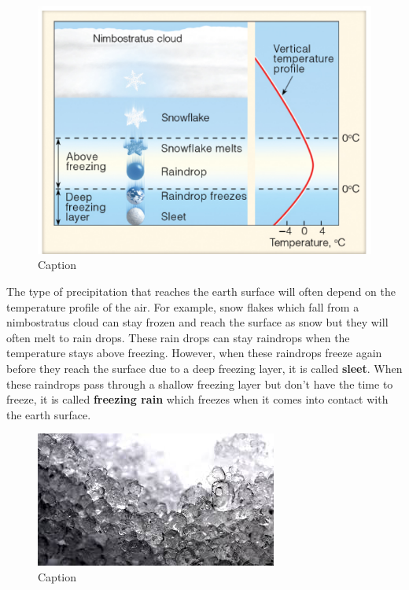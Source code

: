 \documentclass[12pt,oneside]{book}
\begin{document}
\begin{figure}

{\centering \includegraphics[width=0.9\linewidth]{figures/Figure338} 

}

\caption{Caption}\label{fig:Virga2}
\end{figure}

The type of precipitation that reaches the earth surface will often
depend on the temperature profile of the air. For example, snow flakes
which fall from a nimbostratus cloud can stay frozen and reach the
surface as snow but they will often melt to rain drops. These rain drops
can stay raindrops when the temperature stays above freezing. However,
when these raindrops freeze again before they reach the surface due to a
deep freezing layer, it is called \textbf{sleet}. When these raindrops
pass through a shallow freezing layer but don't have the time to freeze,
it is called \textbf{freezing rain} which freezes when it comes into
contact with the earth surface.

\begin{figure}

{\centering \includegraphics[width=0.9\linewidth]{figures/Figure339} 

}

\caption{Caption}\label{fig:Sleet}
\end{figure}
\end{document}
